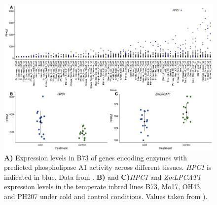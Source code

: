 \documentclass[9pt,twocolumn,twoside,lineno]{biorxiv}
\newcommand{\hpc}{\textit{HPC1}\xspace}
\begin{document}
\begin{figure}[t]
\begin{center}
\includegraphics[width=0.8\paperwidth]{Sup_Figures/Sup_Fig_4.png}
\caption{\textbf{A)} Expression levels in B73 of genes encoding enzymes with predicted phospholipase A1 activity across different tissues. \hpc is indicated in blue. 
Data from \cite{Stelpflug2016-vr}.
\textbf{B)}  and \textbf{C)}\hpc and \textit{ZmLPCAT1} expression levels in the temperate inbred lines B73, Mo17, OH43, and PH207 under cold and control conditions. Values taken from \cite{Waters2017-nat}).
}
\label{figure:Sup:B73_expression}
\end{center}
\end{figure} 

\clearpage
\end{document}
